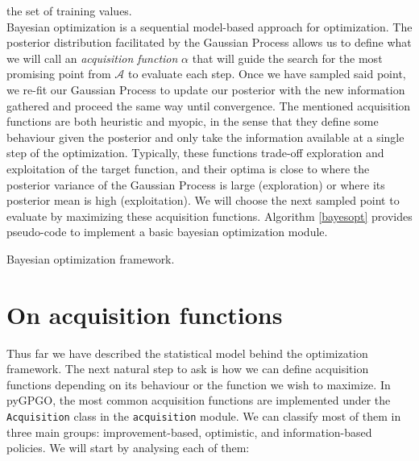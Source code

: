 \documentclass[10pt,a4paper,twoside]{book}
\DeclareMathOperator*{\argmax}{arg\,max}
\begin{document}
the set of training values.\\

Bayesian optimization is a sequential model-based approach for optimization. The posterior distribution facilitated by the Gaussian Process allows us to define what we will call an \textit{acquisition function} $\alpha$ that will guide the search for the most promising point from $\mathcal{A}$ to evaluate each step. Once we have sampled said point, we re-fit our Gaussian Process to update our posterior with the new information gathered and proceed the same way until convergence. The mentioned acquisition functions are both heuristic and myopic, in the sense that they define some behaviour given the posterior and only take the information available at a single step of the optimization. Typically, these functions trade-off exploration and exploitation of the target function, and their optima is close to where the posterior variance of the Gaussian Process is large (exploration) or where its posterior mean is high (exploitation). We will choose the next sampled point to evaluate by maximizing these acquisition functions. Algorithm \ref{bayesopt} provides pseudo-code to implement a basic bayesian optimization module.


\begin{algorithm}
	\caption{Bayesian optimization framework.}
		\label{bayesopt}
		\begin{algorithmic}[1]
				\State{$\boldsymbol{x}_{n+1} \gets \argmax_{\boldsymbol{x}} \alpha(\boldsymbol{x}, \mathcal{D}_n)$}
			\EndFor
		\end{algorithmic}
\end{algorithm}

\section{On acquisition functions}

Thus far we have described the statistical model behind the optimization framework. The next natural step to ask is how we can define acquisition functions depending on its behaviour or the function we wish to maximize. In pyGPGO, the most common acquisition functions are implemented under the \texttt{Acquisition} class in the \texttt{acquisition} module. We can classify most of them in three main groups: improvement-based, optimistic, and information-based policies. We will start by analysing each of them:
\end{document}
